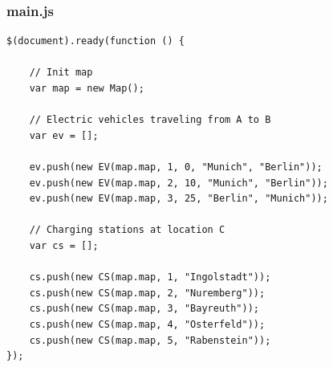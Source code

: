 \begin{frame}[fragile]
\frametitle{main.js}

\begin{verbatim}
$(document).ready(function () {

    // Init map
    var map = new Map();

    // Electric vehicles traveling from A to B
    var ev = [];

    ev.push(new EV(map.map, 1, 0, "Munich", "Berlin"));
    ev.push(new EV(map.map, 2, 10, "Munich", "Berlin"));
    ev.push(new EV(map.map, 3, 25, "Berlin", "Munich"));

    // Charging stations at location C
    var cs = [];

    cs.push(new CS(map.map, 1, "Ingolstadt"));
    cs.push(new CS(map.map, 2, "Nuremberg"));
    cs.push(new CS(map.map, 3, "Bayreuth"));
    cs.push(new CS(map.map, 4, "Osterfeld"));
    cs.push(new CS(map.map, 5, "Rabenstein"));
});
\end{verbatim}

\end{frame}
\clearpage
